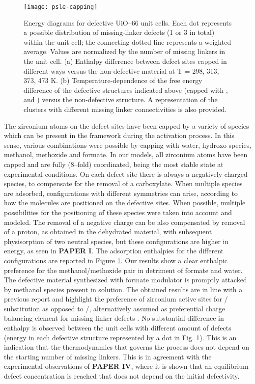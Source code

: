 %
\begin{figure}[H]
	\centering
	\texttt{[image: psle-capping]}
	\caption{Energy diagrams for defective UiO--66 unit cells. Each dot represents a possible distribution of missing-linker defects (1 or 3 in total) within the unit cell; the connecting dotted line represents a weighted average. Values are normalized by the number of missing linkers in the unit cell. (a) Enthalpy difference between defect sites capped in different ways versus the non-defective material at T = 298, 313, 373, 473 K. (b) Temperature-dependence of the free energy difference of the defective structures indicated above (capped with ,  and ) versus the non-defective structure. A representation of the clusters with different missing linker connectivities is also provided.}
	\label{fig:psle-capping}
\end{figure}
\npar
The zirconium atoms on the defect sites have been capped by a variety of species which can be present in the framework during the activation process. In this sense, various combinations were possible by capping with water, hydroxo species, methanol, methoxide and formate. In our models, all zirconium atoms have been capped and are fully (8--fold) coordinated, being the most stable state at experimental conditions. On each defect site there is always a negatively charged species, to compensate for the removal of a carboxylate. When multiple species are adsorbed, configurations with different symmetries can arise, according to how the molecules are positioned on the defective sites. When possible, multiple possibilities for the positioning of these species were taken into account and modeled. The removal of a negative charge can be also compensated by removal of a proton, as obtained in the dehydrated material, with subsequent physisorption of two neutral species, but these configurations are higher in energy, as seen in \textbf{PAPER I}. The adsorption enthalpies for the different configurations are reported in Figure \ref{fig:psle-capping}. Our results show a clear enthalpic preference for the methanol/methoxide pair in detriment of formate and water. The defective material synthesized with formate modulator is promptly attacked by methanol species present in solution. The obtained results are in line with a previous report \cite{yang2016tuning} and highlight the preference of zirconium active sites for / substitution as opposed to /, alternatively assumed as preferential charge balancing element for missing linker defects \cite{trickett2015definitive, ling2016dynamic}. No substantial difference in enthalpy is observed between the unit cells with different amount of defects (energy in each defective structure represented by a dot in Fig. \ref{fig:psle-capping}). This is an indication that the thermodynamics that governs the process does not depend on the starting number of missing linkers. This is in agreement with the experimental observations of \textbf{PAPER IV}, where it is shown that an equilibrium defect concentration is reached that does not depend on the initial defectivity.
